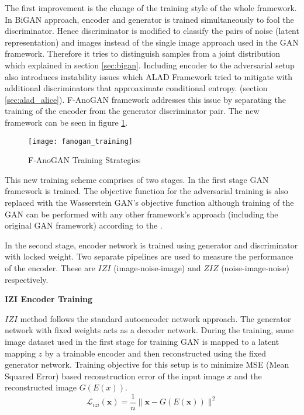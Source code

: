 The first improvement is the change of the training style of the whole framework. In BiGAN approach,
encoder and generator is trained simultaneously to fool the discriminator. Hence discriminator is
modified to classify the pairs of noise (latent representation) and images instead of the single
image approach used in the GAN framework. Therefore it tries to distinguish samples from a joint
distribution which explained in section \ref{sec:bigan}. Including encoder to the adversarial setup
also introduces instability issues which ALAD Framework \cite{DBLP:journals/corr/abs-1812-02288}
tried to mitigate with additional discriminators that approaximate conditional entropy. (section
\ref{sec:alad_alice}). F-AnoGAN framework addresses this issue by separating the training of the
encoder from the generator discriminator pair. The new framework can be seen in figure
\ref{fig:fanogan_training}. 
\begin{figure}[h!]
	\centering
	\texttt{[image: fanogan\_training]}
	\caption{F-AnoGAN Training Strategies \cite{pub.1111824956}}
	\label{fig:fanogan_training}
\end{figure}

This new training scheme comprises of two stages. In the first stage GAN framework is trained. The
objective function for the adversarial training is also replaced with the Wasserstein GAN's
objective function \cite{Arjovsky2017WassersteinG}
although training of the GAN can be performed with any other framework's approach (including the
original GAN framework) according to the \cite{pub.1111824956}.

In the second stage, encoder network is trained using generator and discriminator with locked
weight. Two separate pipelines are used to measure the performance of the encoder. These are $IZI$
(image-noise-image) and $ZIZ$ (noise-image-noise) respectively. 

\textbf{IZI Encoder Training}

$IZI$ method follows the standard autoencoder network approach. The generator network with fixed
weights acts as a decoder network. During the training, same image dataset used in the first stage
for training GAN is mapped to a latent mapping $z$ by a trainable encoder and then reconstructed
using the fixed generator network. Training objective for this setup is to minimize MSE (Mean
Squared Error) based reconstruction error of the input image $x$ and the reconstructed image
$G(E(x))$. 
\begin{equation}
	\mathcal{L}_{i z i}(\mathbf{x})=\frac{1}{n}\|\mathbf{x}-G(E(\mathbf{x}))\|^{2}
\end{equation}

